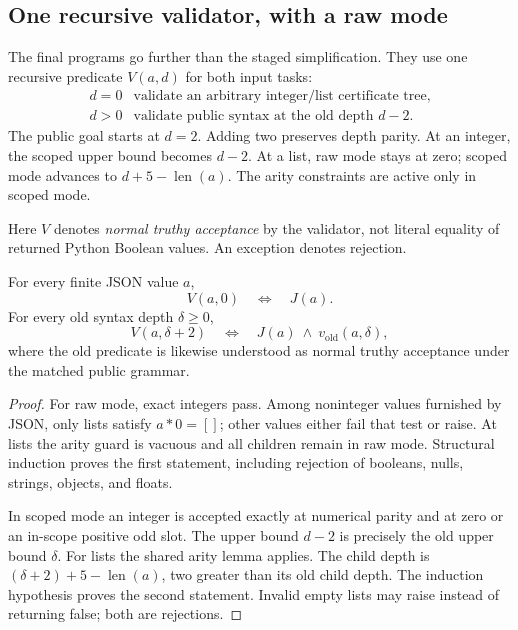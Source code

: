 \subsection{One recursive validator, with a raw mode}

The final programs go further than the staged simplification. They
use one recursive predicate $V(a,d)$ for both input tasks:
\[
 \begin{array}{c|l}
 d=0&\text{validate an arbitrary integer/list certificate tree},\\
 d>0&\text{validate public syntax at the old depth }d-2.
 \end{array}
\]
The public goal starts at $d=2$. Adding two preserves depth parity.
At an integer, the scoped upper bound becomes $d-2$. At a list,
raw mode stays at zero; scoped mode advances to
$d+5-\operatorname{len}(a)$. The arity constraints are active only
in scoped mode.

Here $V$ denotes \emph{normal truthy acceptance} by the validator,
not literal equality of returned Python Boolean values. An exception
denotes rejection.

\begin{lemma}
For every finite JSON value $a$,
\[
 V(a,0)\quad\Longleftrightarrow\quad J(a).
\]
For every old syntax depth $\delta\geq0$,
\[
 V(a,\delta+2)\quad\Longleftrightarrow\quad
 J(a)\ \wedge\ v_{\mathrm{old}}(a,\delta),
\]
where the old predicate is likewise understood as normal truthy
acceptance under the matched public grammar.
\end{lemma}
\begin{proof}
For raw mode, exact integers pass. Among noninteger values furnished
by JSON, only lists satisfy $a*0=[]$; other values either fail that
test or raise. At lists the arity guard is vacuous and all children
remain in raw mode. Structural induction proves the first statement,
including rejection of booleans, nulls, strings, objects, and floats.

In scoped mode an integer is accepted exactly at numerical parity
and at zero or an in-scope positive odd slot. The upper bound $d-2$
is precisely the old upper bound $\delta$. For lists the shared
arity lemma applies. The child depth is
$(\delta+2)+5-\operatorname{len}(a)$, two greater than its old child
depth. The induction hypothesis proves the second statement.
Invalid empty lists may raise instead of returning false; both
are rejections.
\end{proof}

